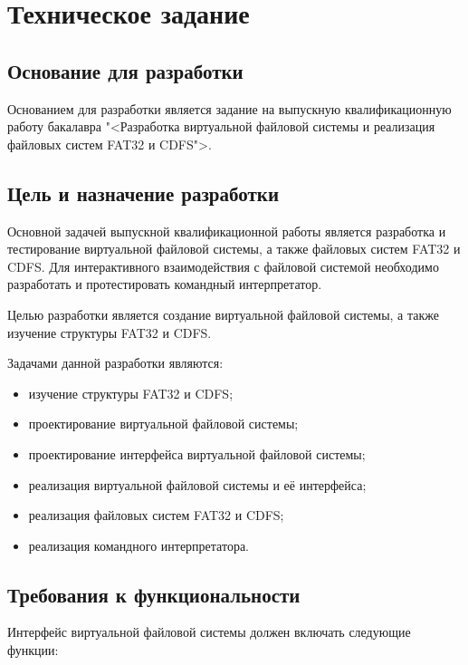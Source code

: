 \section{Техническое задание}
\subsection{Основание для разработки}

Основанием для разработки является задание на выпускную квалификационную работу бакалавра "<Разработка виртуальной файловой системы и реализация файловых систем FAT32 и CDFS">.

\subsection{Цель и назначение разработки}

Основной задачей выпускной квалификационной работы является разработка и тестирование виртуальной файловой системы, а также файловых систем FAT32 и CDFS. Для интерактивного взаимодействия с файловой системой необходимо разработать и протестировать командный интерпретатор.

Целью разработки является создание виртуальной файловой системы, а также изучение структуры FAT32 и CDFS.

Задачами данной разработки являются:
\begin{itemize}
\item изучение структуры FAT32 и CDFS;
\item проектирование виртуальной файловой системы;
\item проектирование интерфейса виртуальной файловой системы;
\item реализация виртуальной файловой системы и её интерфейса;
\item реализация файловых систем FAT32 и CDFS;
\item реализация командного интерпретатора.
\end{itemize}

\subsection{Требования к функциональности}

Интерфейс виртуальной файловой системы должен включать следующие функции:

